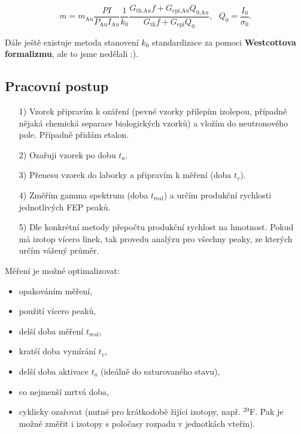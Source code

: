\begin{equation}
    \boxed{
        m = m_\text{Au} \dfrac{P I}{P_\text{Au} I_\text{Au}} \dfrac{1}{k_0} \dfrac{G_\text{th,Au} f + G_\text{epi,Au} Q_{0\text{,Au}}}{G_\text{th} f + G_\text{epi} Q_{0}}, \: \: \: Q_0 = \dfrac{I_0}{\sigma_0}.
    }
\end{equation}

Dále ještě existuje metoda stanovení $k_0$ standardizace za pomoci \textbf{Westcottova formalizmu}, ale to jsme nedělali :).

\subsection{Pracovní postup}

\begin{itemize}
    \item[1)] Vzorek připravím k ozáření (pevné vzorky přilepím izolepou, případně nějaká chemická separace biologických vzorků) a vložím do neutronového pole. Případně přidám etalon.
    \item[2)] Ozařuji vzorek po dobu $t_a$.
    \item[3)] Přenesu vzorek do laborky a připravím k měření (doba $t_v$).
    \item[4)] Změřím gamma spektrum (doba $t_\text{real}$) a určím produkční rychlosti jednotlivých FEP peaků.
    \item[5)] Dle konkrétní metody přepočtu produkční rychlost na hmotnost. Pokud má izotop vícero linek, tak provedu analýzu pro všechny peaky, ze kterých určím vážený průměr.
\end{itemize}

Měření je možné optimalizovat:

\begin{itemize}
    \item opakováním měření, 
    \item použití vícero peaků,
    \item delší doba měření $t_\text{real}$,
    \item kratší doba vymírání $t_v$,
    \item delší doba aktivace $t_a$ (ideálně do saturovaného stavu),
    \item co nejmenší mrtvá doba,
    \item cyklicky ozařovat (nutné pro krátkodobě žijící izotopy, např. $^{20}$F. Pak je možné změřit i izotopy s poločasy rozpadu v jednotkách vteřin).
\end{itemize}


